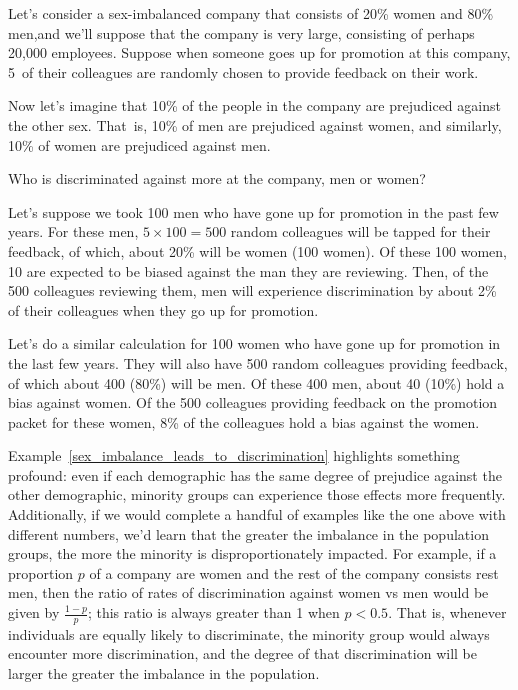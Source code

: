 \begin{examplewrap}
\begin{nexample}{Let's consider a sex-imbalanced
    company that consists of 20\% women
    and 80\% men,\footnotemark and we'll suppose that the
    company is very large, consisting of perhaps
    20,000 employees.
    Suppose when someone goes up for promotion at this
    company, 5~of their colleagues are randomly chosen
    to provide feedback on their work.
    \exspace{}

    Now let's imagine that 10\% of the people in the
    company are prejudiced against the other sex.
    That~is, 10\% of men are prejudiced against women,
    and similarly, 10\% of women are prejudiced against men.
    \exspace{}
    
    Who is discriminated against more at the company,
    men or women?}
  \label{sex_imbalance_leads_to_discrimination}%
  Let's suppose we took 100 men who have gone up for
  promotion in the past few years.
  For these men, $5 \times 100 = 500$ random colleagues
  will be tapped for their feedback, of which,
  about 20\% will be women (100 women).
  Of these 100 women, 10 are expected to be biased
  against the man they are reviewing.
  Then, of the 500 colleagues reviewing them,
  men will experience
  discrimination by about 2\% of their colleagues when
  they go up for promotion.

  Let's do a similar calculation for 100 women
  who have gone up for promotion in the last few years.
  They will also have 500 random colleagues providing
  feedback, of which about 400 (80\%) will be men.
  Of these 400 men, about 40 (10\%) hold a bias against
  women.
  Of the 500 colleagues providing feedback on the
  promotion packet for these women, 8\% of the
  colleagues hold a bias against the women.
\end{nexample}
\end{examplewrap}

Example~\ref{sex_imbalance_leads_to_discrimination}
highlights something profound:
even if each demographic has the same degree of prejudice
against the other demographic, minority groups can
experience those effects more frequently.
Additionally, if we would complete a handful of examples
like the one above with different numbers,
we'd learn that the greater the imbalance
in the population groups, the more the minority
is disproportionately impacted.
For example, if a proportion $p$ of a company are
women and the rest of the company consists rest men,
then the ratio of rates of discrimination against women
vs men would be given by $\frac{1 - p}{p}$;
this ratio is always greater than 1 when $p < 0.5$.
That is, whenever individuals are equally likely to
discriminate, the minority group would always encounter
more discrimination, and the degree of that discrimination
will be larger the greater the imbalance in the population.

